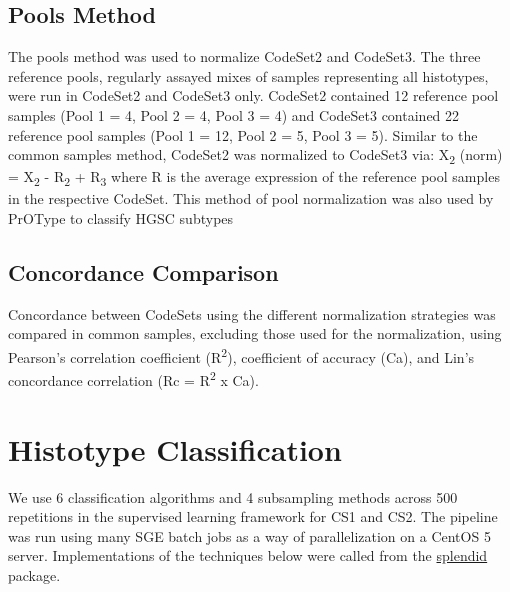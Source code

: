 \documentclass[
]{report}
\begin{document}
\hypertarget{pools-method}{%
\subsection{Pools Method}\label{pools-method}}

The pools method was used to normalize CodeSet2 and CodeSet3. The three reference pools, regularly assayed mixes of samples representing all histotypes, were run in CodeSet2 and CodeSet3 only. CodeSet2 contained 12 reference pool samples (Pool 1 = 4, Pool 2 = 4, Pool 3 = 4) and CodeSet3 contained 22 reference pool samples (Pool 1 = 12, Pool 2 = 5, Pool 3 = 5). Similar to the common samples method, CodeSet2 was normalized to CodeSet3 via: X\textsubscript{2} (norm) = X\textsubscript{2} - R\textsubscript{2} + R\textsubscript{3} where R is the average expression of the reference pool samples in the respective CodeSet. This method of pool normalization was also used by PrOType to classify HGSC subtypes

\hypertarget{concordance-comparison}{%
\subsection{Concordance Comparison}\label{concordance-comparison}}

Concordance between CodeSets using the different normalization strategies was compared in common samples, excluding those used for the normalization, using Pearson's correlation coefficient (R\textsuperscript{2}), coefficient of accuracy (Ca), and Lin's concordance correlation (Rc = R\textsuperscript{2} x Ca).

\hypertarget{histotype-classification}{%
\section{Histotype Classification}\label{histotype-classification}}

We use 6 classification algorithms and 4 subsampling methods across 500 repetitions in the supervised learning framework for CS1 and CS2. The pipeline was run using many SGE batch jobs as a way of parallelization on a CentOS 5 server. Implementations of the techniques below were called from the \href{https://alinetalhouk.github.io/splendid/}{splendid} package.
\end{document}
